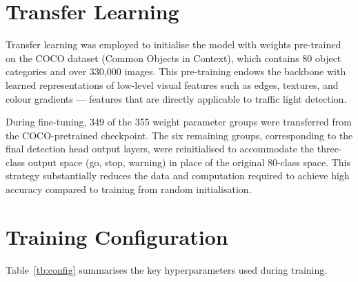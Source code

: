 \section{Transfer Learning}

Transfer learning was employed to initialise the model with weights pre-trained on the COCO dataset (Common Objects in Context), which contains 80 object categories and over 330,000 images. This pre-training endows the backbone with learned representations of low-level visual features such as edges, textures, and colour gradients --- features that are directly applicable to traffic light detection.

During fine-tuning, 349 of the 355 weight parameter groups were transferred from the COCO-pretrained checkpoint. The six remaining groups, corresponding to the final detection head output layers, were reinitialised to accommodate the three-class output space (go, stop, warning) in place of the original 80-class space. This strategy substantially reduces the data and computation required to achieve high accuracy compared to training from random initialisation.

\section{Training Configuration}

Table~\ref{tb:config} summarises the key hyperparameters used during training.

